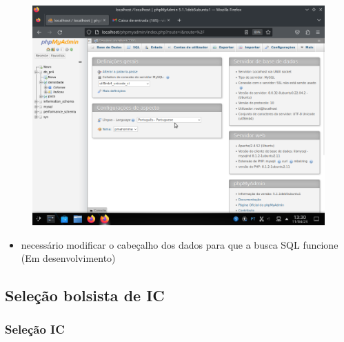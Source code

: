 \documentclass[aspectratio=169]{beamer} %
\begin{document}
{{\begin{frame}
	    \begin{figure}
		    \includegraphics[scale=0.3]{images/BD.png}
	    \end{figure}

\pause
	\begin{itemize}
		\item necessário modificar o cabeçalho dos dados para que a busca SQL funcione (Em desenvolvimento)
	\end{itemize}

\end{frame} 
}


\subsection{Seleção bolsista de IC}


{
\begin{frame}
	\frametitle{Seleção IC}




\end{frame}}}
\end{document}
